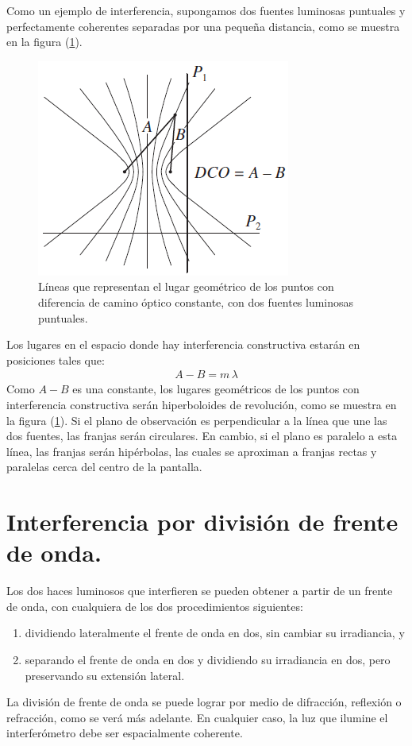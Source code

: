 \documentclass[14pt]{extarticle}
\begin{document}
Como un ejemplo de interferencia, supongamos dos fuentes luminosas puntuales y perfectamente coherentes separadas por una pequeña distancia, como se muestra en la figura (\ref{fig:figura_IX_01}).
\begin{figure}[H]
    \centering
    \includegraphics[scale=1]{Imagenes/Interferencia_01.png}
    \caption{Líneas que representan el lugar geométrico de los puntos con diferencia de camino óptico constante, con dos fuentes luminosas puntuales.}
    \label{fig:figura_IX_01}
\end{figure}
Los lugares en el espacio donde hay interferencia constructiva estarán en posiciones tales que:
\begin{align}
A - B = m \, \lambda
\label{eq:ecuacion_IX_10}
\end{align}
Como $A - B$ es una constante, los lugares geométricos de los puntos con interferencia constructiva serán hiperboloides de revolución, como se muestra en la figura (\ref{fig:figura_IX_01}). Si el plano de observación es perpendicular a la línea que une las dos fuentes, las franjas serán circulares. En cambio, si el plano es paralelo a esta línea, las franjas serán hipérbolas, las cuales se aproximan a franjas rectas y paralelas cerca del centro de la pantalla.

\section{Interferencia por división de frente de onda.}

Los dos haces luminosos que interfieren se pueden obtener a partir de un frente de onda, con cualquiera de los dos procedimientos siguientes:
\begin{enumerate}[label=\alph*)]
\item dividiendo lateralmente el frente de onda en dos, sin cambiar su irradiancia, y
\item separando el frente de onda en dos y dividiendo su irradiancia en dos, pero preservando su extensión lateral.
\end{enumerate}
La división de frente de onda se puede lograr por medio de difracción, reflexión o refracción, como se verá más adelante. En cualquier caso, la luz que ilumine el interferómetro debe ser espacialmente coherente.
\end{document}
